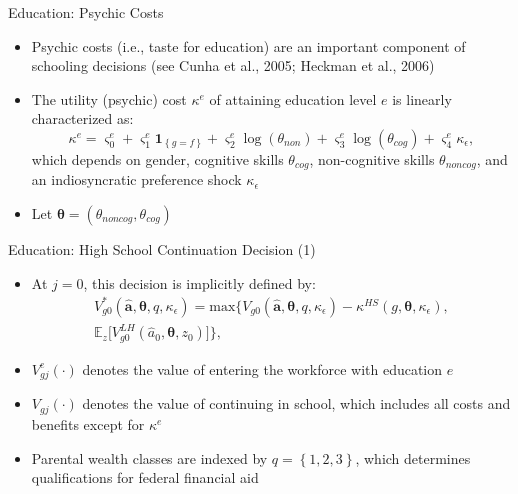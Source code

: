 \documentclass{beamer}
\begin{document}
\begin{frame}{Education: Psychic Costs}
\begin{itemize}
  \item Psychic costs (i.e., taste for education) are an important component of schooling decisions (see 		 Cunha et al., 2005; Heckman et al., 2006)
  \item The utility (psychic) cost $\kappa^{e}$ of attaining education level $e$ is linearly 				characterized as:
 		$$\kappa^{e} = \varsigma^{e}_{0}+\varsigma^{e}_{1}\textbf{1}_{\left\{g=f\right							\}}+\varsigma^{e}_{2}\log{(\theta_{non})}+\varsigma^{e}_{3}\log{(\theta_{cog})}+						\varsigma^{e}_{4}\kappa_{\epsilon},$$
        which depends on gender, cognitive skills $\theta_{cog}$, non-cognitive skills 							$\theta_{noncog}$, and an indiosyncratic preference shock $\kappa_{\epsilon}$
  \item Let $\boldsymbol{\theta}=(\theta_{noncog},\theta_{cog})$
\end{itemize}   
\hyperlink{supplemental2}{}
\end{frame}   

\begin{frame}{Education: High School Continuation Decision (1)}
\begin{itemize}
  \item At $j=0$, this decision is implicitly defined by:
  		\begin{equation*}
  		\begin{aligned}
  		V^*_{g0}(\hat{\textbf{a}},\boldsymbol{\theta},q,\kappa_{\epsilon}) = \mathrm{max}\big\{V_{g0}			(\hat{\textbf{a}},\boldsymbol{\theta},q,\kappa_{\epsilon})-\kappa^{HS}(g,\boldsymbol{\theta},			\kappa_{\epsilon}), \\
        \mathbb{E}_{z}\big[V^{LH}_{g0}(\hat{a}_0,\boldsymbol{\theta},z_0)\big]\big\},
        \end{aligned}
        \end{equation*}
  \item $V^{e}_{gj}(\cdot)$ denotes the value of entering the workforce with education $e$
  \item $V_{gj}(\cdot)$ denotes the value of continuing in school, which includes all costs and 				benefits except for $\kappa^{e}$
  \item Parental wealth classes are indexed by $q=\left\{1,2,3\right\}$, which determines 					qualifications for federal financial aid
\end{itemize}      
\end{frame} 
\end{document}
